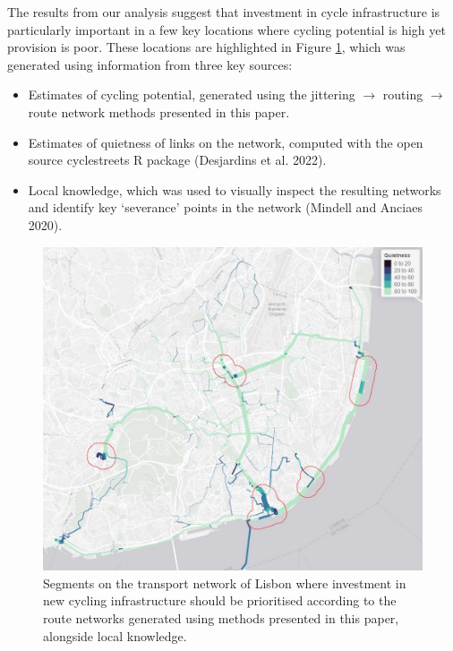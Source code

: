 \documentclass{isprs} %
\providecommand{\tightlist}{%
  \setlength{\itemsep}{0pt}\setlength{\parskip}{0pt}}
\begin{document}
The results from our analysis suggest that investment in cycle infrastructure is particularly important in a few key locations where cycling potential is high yet provision is poor.
These locations are highlighted in Figure \ref{fig:segments}, which was generated using information from three key sources:

\begin{itemize}
\tightlist
\item
  Estimates of cycling potential, generated using the jittering \(\rightarrow\) routing \(\rightarrow\) route network methods presented in this paper.
\item
  Estimates of quietness of links on the network, computed with the open source cyclestreets R package (Desjardins et al. 2022).
\item
  Local knowledge, which was used to visually inspect the resulting networks and identify key `severance' points in the network (Mindell and Anciaes 2020).
\end{itemize}

\begin{figure}

{\centering \includegraphics[width=1\linewidth]{figures/priority-segments} 

}

\caption{Segments on the transport network of Lisbon where investment in new cycling infrastructure should be prioritised according to the route networks generated using methods presented in this paper, alongside local knowledge.}\label{fig:segments}
\end{figure}
\end{document}
